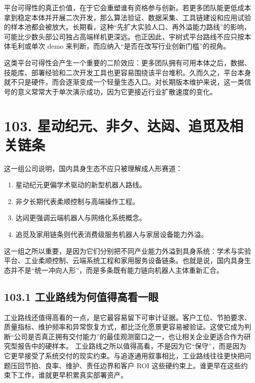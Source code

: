 平台可得性的真正价值，在于它会重塑谁有资格参与创新。若更多团队能更低成本拿到稳定本体并开展二次开发，那么算法验证、数据采集、工具链建设和应用试验的样本池都会被放大。长期看，这种“先扩大实验人口、再外溢能力路线”的影响，可能比少数头部公司独占高端样机更深远。也正因此，宇树式平台路线不应只按本体毛利或单次 demo 来判断，而应纳入“是否在改写行业创新门槛”的视角。

这类平台可得性会产生一个重要的二阶效应：更多团队拥有可用本体之后，数据、技能库、部署经验和二次开发工具也更容易围绕该平台堆积。久而久之，平台本身就不只是硬件，而会逐渐变成一个轻量生态入口。对长期版本维护来说，这一类信号的意义常常大于单次演示成功，因为它更接近行业扩散速度的变化。

\chapter*{103. 星动纪元、非夕、达闼、追觅及相关链条}

这一组公司说明，国内具身生态不应只被理解成人形赛道：

\begin{enumerate}
\item 星动纪元更偏学术驱动的新型机器人路线。
\item 非夕长期代表柔顺控制与高端操作工程。
\item 达闼更强调云端机器人与网络化系统概念。
\item 追觅及家用链条则代表消费级服务机器人与家居设备能力外溢。
\end{enumerate}

这一组之所以重要，是因为它们分别把不同产业能力外溢到具身系统：学术与实验平台、工业柔顺控制、云端系统工程和家用服务设备链条。也就是说，国内具身生态并不是“统一冲向人形”，而是多条既有能力链向机器人主体重新汇合。

\section*{103.1 工业路线为何值得高看一眼}


工业路线还值得高看的一点，是它最容易留下可审计证据。客户工位、节拍要求、质量指标、维护频率和异常恢复方式，都比泛化愿景更容易被验证。这使它成为判断“公司是否真正拥有交付能力”的最佳观测窗口之一，也让相关企业更适合作为研究型报告中的硬样本。 工业路线之所以值得高看，不是因为它“保守”，而是因为它更早接受了系统交付的现实约束。与追逐通用叙事相比，工业路线往往更快把问题压回节拍、良率、维护、责任边界和客户 ROI 这些硬约束上。谁更早在这些约束下工作，谁就更早积累真实部署资产。

